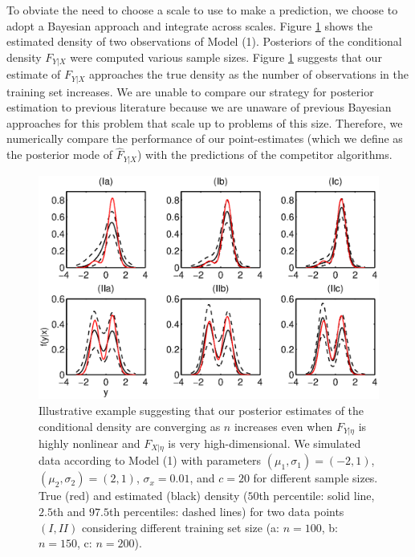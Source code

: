 \documentclass{article} %
\providecommand{\mh}[1]{\hat{#1}}
\begin{document}
To obviate the need to choose a scale to use to make a prediction, we choose to adopt a Bayesian approach and integrate across scales.  Figure \ref{plotDensity} shows the estimated density of two observations of Model (1).  Posteriors of the conditional density  $F_{Y|X}$  were computed various sample sizes. Figure \ref{plotDensity} suggests that our estimate of $F_{Y|X}$ approaches the true density as the number of observations in the training set increases. We are unable to compare our strategy for posterior estimation to previous literature because we are unaware of previous Bayesian approaches for this problem that scale up to problems of this size. Therefore, we numerically compare the performance of our point-estimates (which we define as the posterior mode of $\mh{F}_{Y|X}$) with the predictions of the competitor algorithms.

\begin{figure}[h!]
\centering
 \vskip -10pt 
\includegraphics[width=120mm]{../figs/ch3_density.eps}
 \vskip -15pt 
\caption{Illustrative example suggesting that our posterior estimates of the conditional density are converging as $n$ increases even when $F_{Y|\eta}$ is highly nonlinear and $F_{X|\eta}$ is very high-dimensional.  We simulated data according to Model (1) with parameters $(\mu_1,\sigma_1)=(-2,1)$, $(\mu_2,\sigma_2)=(2,1)$, $\sigma_x=0.01$, and $c=20$ for different sample sizes. True (red) and estimated (black) density ($50$th percentile: solid line, $2.5$th and $97.5$th percentiles: dashed lines) for two data points $(I, II)$ considering different training set size (a: $n=100$, b: $n=150$, c: $n=200$). } \label{plotDensity}
\end{figure}
\end{document}
